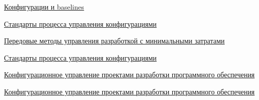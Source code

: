 \documentclass{../industrial-development}
\begin{document}
\begin{thebibliography}{99}

 \href{https://special.habrahabr.ru/kyocera/p/67839/}{Конфигурации и baselines}

 \href{https://www.osp.ru/os/2013/07/13037353/}{Стандарты процесса управления конфигурациями}

 \href{https://www.ibm.com/developerworks/ru/library/kroll_ambler/index.html}{Передовые методы управления разработкой с минимальными затратами}

 \href{https://habrahabr.ru/post/211306/}{Стандарты процесса управления конфигурациями}

 \href{http://cmcons.com/articles/CC_CQ/konfiguratsionnoe_upravlenie_proektami_razrabotki_programmnogo_obespechenija/}{Конфигурационное управление проектами разработки программного обеспечения}

 \href{http://citforum.ru/SE/quality/configuration_management/}{Конфигурационное управление проектами разработки программного обеспечения}
\end{thebibliography}
\end{document}
